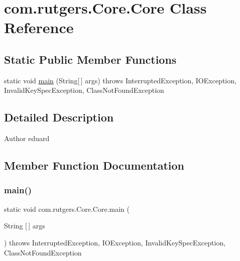 \hypertarget{classcom_1_1rutgers_1_1Core_1_1Core}{}\section{com.\+rutgers.\+Core.\+Core Class Reference}
\label{classcom_1_1rutgers_1_1Core_1_1Core}
\subsection*{Static Public Member Functions}
\begin{DoxyCompactItemize}
\item 
static void \hyperlink{classcom_1_1rutgers_1_1Core_1_1Core_a3372560286c744be181d6e2443a0a1c5}{main} (String\mbox{[}$\,$\mbox{]} args)  throws Interrupted\+Exception, I\+O\+Exception, Invalid\+Key\+Spec\+Exception, Class\+Not\+Found\+Exception 
\end{DoxyCompactItemize}


\subsection{Detailed Description}
\begin{DoxyAuthor}{Author}
eduard 
\end{DoxyAuthor}


\subsection{Member Function Documentation}
\mbox{\label{classcom_1_1rutgers_1_1Core_1_1Core_a3372560286c744be181d6e2443a0a1c5}} 
\subsubsection{\texorpdfstring{main()}{main()}}
{\footnotesize\ttfamily static void com.\+rutgers.\+Core.\+Core.\+main (\begin{DoxyParamCaption}\item[{String \mbox{[}$\,$\mbox{]}}]{args }\end{DoxyParamCaption}) throws Interrupted\+Exception, I\+O\+Exception, Invalid\+Key\+Spec\+Exception, Class\+Not\+Found\+Exception\hspace{0.3cm}{\ttfamily [static]}}

